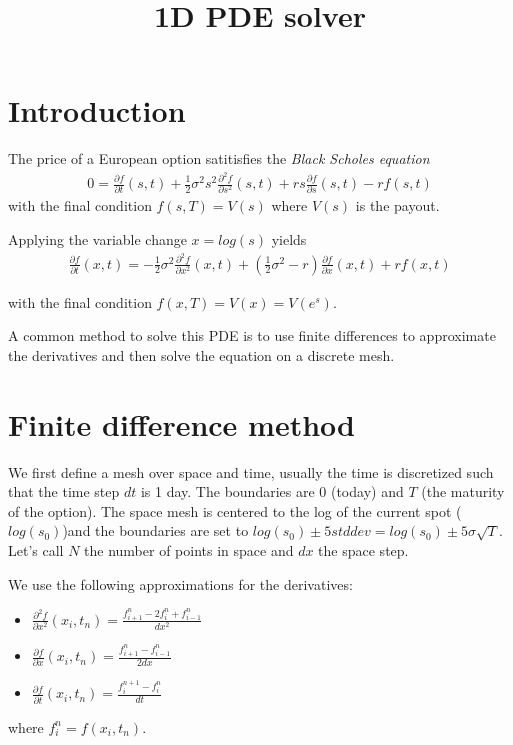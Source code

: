 \documentclass[a4paper]{article}
\begin{document}
\title{1D PDE solver}

\section{Introduction}

The price of a European option satitisfies the \textit{Black Scholes equation}
\begin{gather*}
0 = \frac{\partial f}{\partial t}(s, t) + \frac{1}{2}\sigma^2 s^2 \frac{\partial^2 f}{\partial s^2}(s, t)
+ r s \frac{\partial f}{\partial s}(s, t) - rf(s, t)
\end{gather*}
with the final condition $f(s, T) = V(s)$ where $V(s)$ is the payout.

Applying the variable change $x = log(s)$ yields
\begin{gather*}
\frac{\partial f}{\partial t}(x, t) = -\frac{1}{2}\sigma^2 \frac{\partial^2 f}{\partial x^2}(x, t)
+ (\frac{1}{2}\sigma^2 - r) \frac{\partial f}{\partial x}(x, t) + rf(x, t)
\end{gather*}

with the final condition $f(x, T) = V(x) = V(e^s)$.

A common method to solve this PDE is to use finite differences to approximate the derivatives and then
solve the equation on a discrete mesh.

\section{Finite difference method}

We first define a mesh over space and time, usually the time is discretized such that the time step $dt$ is 1 day.
The boundaries are $0$ (today) and $T$ (the maturity of the option). The space mesh is centered to the log of the
current spot ($log(s_0)$)and the boundaries are set to $log(s_0) \pm5stddev = log(s_0) \pm 5 \sigma \sqrt{T}$.
Let's call $N$ the number of points in space and $dx$ the space step.

We use the following approximations for the derivatives:

\begin{itemize}
\item $\frac{\partial^2 f}{\partial x^2}(x_i, t_n) = \frac{f_{i+1}^n - 2 f_i^n + f_{i-1}^n}{dx^2}$
\item $\frac{\partial f}{\partial x}(x_i, t_n) = \frac{f_{i+1}^n - f_{i-1}^n}{2dx}$
\item $\frac{\partial f}{\partial t}(x_i, t_n) = \frac{f_i^{n+1} - f_i^{n}}{dt}$
\end{itemize}
where ${f_i^n = f(x_i, t_n)}$.
\end{document}
